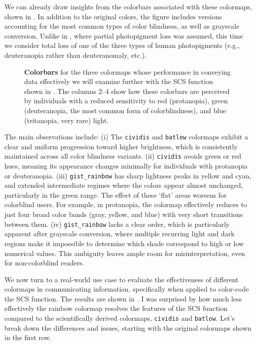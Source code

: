 We can already draw insights from the colorbars associated with these colormaps, shown in . In addition to the original colors, the figure includes versions accounting for the most common types of color blindness, as well as grayscale conversion. Unlike in , where partial photopigment loss was assumed, this time we consider total loss of one of the three types of human photopigments (e.g., deuteranopia rather than deuteranomaly, etc.).

\begin{figure}
	\centering
	
	\caption{\textbf{Colorbars} for the three colormaps whose performance in conveying data effectively we will examine further with the SCS function shown in . The columns 2--4 show how these colorbars are perceived by individuals with a reduced sensitivity to red (protanopia), green (deuteranopia, the most common form of colorblindness), and blue (tritanopia, very rare) light.}
	\label{fig:colorbars}
\end{figure}

The main observations include: (i) The \verb|cividis| and \verb|batlow| colormaps exhibit a clear and uniform progression toward higher brightness, which is consistently maintained across all color blindness variants. (ii) \verb|cividis| avoids green or red hues, meaning its appearance changes minimally for individuals with protanopia or deuteranopia. (iii) \verb|gist_rainbow| has sharp lightness peaks in yellow and cyan, and extended intermediate regimes where the colors appear almost unchanged, particularly in the green range. The effect of these `flat' areas worsens for colorblind users. For example, in protanopia, the colormap effectively reduces to just four broad color bands (gray, yellow, and blue) with very short transitions between them. (iv) \verb|gist_rainbow| lacks a clear order, which is particularly apparent after grayscale conversion, where multiple recurring light and dark regions make it impossible to determine which shade correspond to high or low numerical values. This ambiguity leaves ample room for misinterpretation, even for non-colorblind readers.

We now turn to a real-world use case to evaluate the effectiveness of different colormaps in communicating information, specifically when applied to color-code the SCS function. The results are shown in . I was surprised by how much less effectively the rainbow colormap resolves the features of the SCS function compared to the scientifically derived colormaps, \verb|cividis| and \verb|batlow|. Let's break down the differences and issues, starting with the original colormaps shown in the first row.

